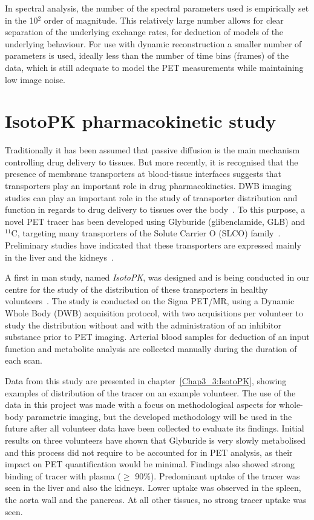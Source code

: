 In spectral analysis, the number of the spectral parameters used is empirically set in the 10$^2$ order of magnitude. This relatively large number allows for clear separation of the underlying exchange rates, for deduction of models of the underlying behaviour. 
For use with dynamic reconstruction a smaller number of parameters is used, ideally less than the number of time bins (frames) of the data, which is still adequate to model the PET measurements while maintaining low image noise.

\section{IsotoPK pharmacokinetic study}
Traditionally it has been assumed that passive diffusion is the main mechanism controlling drug delivery to tissues. 
But more recently, it is recognised that the presence of membrane transporters at blood-tissue interfaces suggests that transporters play an important role in drug pharmacokinetics. DWB imaging studies can play an important role in the study of transporter distribution and function in regards to drug delivery to tissues over the body~\cite{Marie2017}. 
To this purpose, a novel PET tracer has been developed using Glyburide (glibenclamide, GLB) and $^{11}$C, targeting many transporters of the Solute Carrier O (SLCO) family~\cite{Tournier2013,Caille2020}. Preliminary studies have indicated that these transporters are expressed mainly in the liver and the kidneys~\cite{Tournier2013}.

A first in man study, named \textit{IsotoPK}, was designed and is being conducted in our centre for the study of the distribution of these transporters in healthy volunteers~\cite{Marie2019}.
The study is conducted on the Signa PET/MR, using a Dynamic Whole Body (DWB) acquisition protocol, with two acquisitions per volunteer to study the distribution without and with the administration of an inhibitor substance prior to PET imaging.
Arterial blood samples for deduction of an input function and metabolite analysis are collected manually during the duration of each scan. 

Data from this study are presented in chapter~\ref{Chap3_3:IsotoPK}, showing examples of distribution of the tracer on an example volunteer. The use of the data in this project was made with a focus on methodological aspects for whole-body parametric imaging, but the developed methodology will be used in the future after all volunteer data have been collected to evaluate its findings.
Initial results on three volunteers have shown that Glyburide is very slowly metabolised and this process did not require to be accounted for in PET analysis, as their impact on PET quantification would be minimal. Findings also showed strong binding of tracer with plasma ($\geq$ 90\%).
Predominant uptake of the tracer was seen in the liver and also the kidneys. Lower uptake was observed in the spleen, the aorta wall and the pancreas. At all other tissues, no strong tracer uptake was seen.

